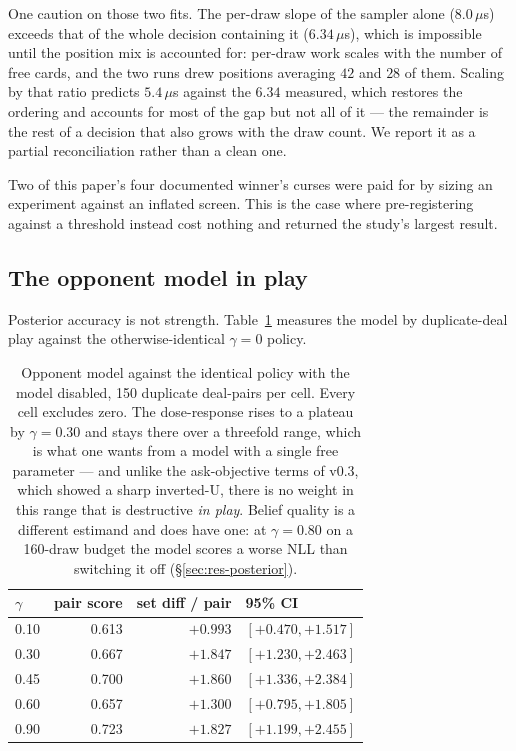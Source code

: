 \documentclass[11pt,letterpaper]{article}
\begin{document}
One caution on those two fits. The per-draw slope of the sampler alone
($8.0\,\mu$s) exceeds that of the whole decision containing it ($6.34\,\mu$s),
which is impossible until the position mix is accounted for: per-draw work scales
with the number of free cards, and the two runs drew positions averaging $42$ and
$28$ of them. Scaling by that ratio predicts $5.4\,\mu$s against the $6.34$
measured, which restores the ordering and accounts for most of the gap but not
all of it --- the remainder is the rest of a decision that also grows with the
draw count. We report it as a partial reconciliation rather than a clean one.

Two of this paper's four documented winner's curses were paid for by sizing an
experiment against an inflated screen. This is the case where pre-registering
against a threshold instead cost nothing and returned the study's largest
result.

\subsection{The opponent model in play}
\label{sec:res-oppmodel}

Posterior accuracy is not strength. Table~\ref{tab:gamma} measures the model by
duplicate-deal play against the otherwise-identical $\gamma = 0$ policy.

\begin{table}[t]
\centering
\small
\begin{tabular}{lrrl}
\toprule
$\gamma$ & pair score & set diff / pair & 95\% CI \\
\midrule
0.10 & 0.613 & $+0.993$ & $[+0.470, +1.517]$ \\
0.30 & 0.667 & $+1.847$ & $[+1.230, +2.463]$ \\
0.45 & 0.700 & $+1.860$ & $[+1.336, +2.384]$ \\
0.60 & 0.657 & $+1.300$ & $[+0.795, +1.805]$ \\
0.90 & 0.723 & $+1.827$ & $[+1.199, +2.455]$ \\
\bottomrule
\end{tabular}
\caption{Opponent model against the identical policy with the model disabled,
150 duplicate deal-pairs per cell. Every cell excludes zero. The dose-response
rises to a plateau by $\gamma = 0.30$ and stays there over a threefold range,
which is what one wants from a model with a single free parameter --- and unlike
the ask-objective terms of v0.3, which showed a sharp inverted-U, there is no
weight in this range that is destructive \emph{in play}. Belief quality is a
different estimand and does have one: at $\gamma = 0.80$ on a 160-draw budget
the model scores a worse NLL than switching it off
(\S\ref{sec:res-posterior}).}
\label{tab:gamma}
\end{table}
\end{document}

